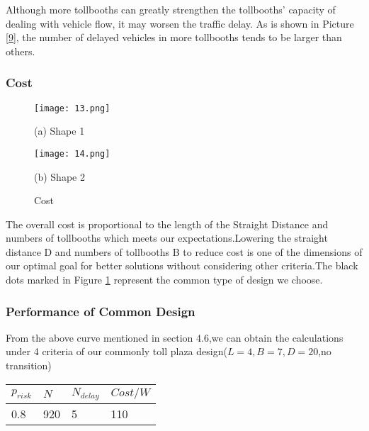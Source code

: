 Although more tollbooths can greatly strengthen the tollbooths' capacity of dealing with vehicle flow, it may worsen the traffic delay. As is shown in Picture \ref{9}, the number of delayed vehicles in more tollbooths tends to be larger than others.

\subsubsection{Cost}
	\begin{figure}[h]
	\centering
\begin{minipage}{0.4\linewidth}
  \centerline{\texttt{[image: 13.png]}}
  \centerline{(a) Shape 1}
\end{minipage}
\hfill
\begin{minipage}{.4\linewidth}
  \centerline{\texttt{[image: 14.png]}}
  \centerline{(b) Shape 2}
\end{minipage}
	\caption{Cost}
	\label{10}
	\end{figure}
The overall cost is proportional to the length of the Straight Distance and numbers of tollbooths which meets our expectations.Lowering the straight distance D and numbers of tollbooths B to reduce cost is one of the dimensions of our optimal goal for better solutions without considering other criteria.The black dots marked in Figure \ref{10} represent the common type of design we choose.

\subsubsection{Performance of Common Design}

From the above curve mentioned in section 4.6,we can obtain the calculations under 4 criteria of our commonly toll plaza design($L=4,B=7,D=20$,no transition)
\begin{table}
\centering
\begin{tabular}{|l|l|l|l|}
\hline

$p_{risk}$ & $N$ & $N_{delay}$ & $Cost/W$\\
\hline
0.8 & 920 & 5 & 110\\
\hline
\end{tabular}
\end{table}

